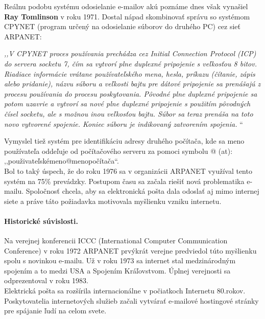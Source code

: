 \documentclass[10pt,twoside,slovak,a4paper]{article}
\begin{document}
Reálnu podobu systému odosielanie e-mailov akú poznáme dnes však vynašiel \textbf{Ray Tomlinson} v roku 1971. Dostal nápad skombinovať správu so systémom CPYNET (program určený na odosielanie súborov do druhého PC) cez sieť ARPANET:
\par
\vspace{.3cm}
\textit{,,V CPYNET proces používania prechádza cez Initial Connection Protocol (ICP) do servera socketu 7, čím sa vytvorí plne duplexné pripojenie s veľkosťou 8 bitov. Riadiace informácie vrátane používateľského mena, hesla, príkazu (čítanie, zápis alebo pridanie), názvu súboru a veľkosti bajtu pre dátové pripojenie sa prenášajú z procesu používania do procesu poskytovania. Pôvodné plne duplexné pripojenie sa potom uzavrie a vytvorí sa nové plne duplexné pripojenie s použitím pôvodných čísel socketu, ale s možnou inou veľkosťou bajtu. Súbor sa teraz prenáša na toto novo vytvorené spojenie. Koniec súboru je indikovaný zatvorením spojenia.} \cite{Bhushan}“
\par
\vspace{.3cm}
Vymyslel tiež systém pre identifikáciu adresy druhého počítača, kde sa meno používateľa oddeľuje od počítačového serveru za pomoci symbolu @ (at): ,,použivateľskémeno@menopočítača“.\\  
\hspace{0.5cm}
Bol to taký úspech, že do roku 1976 sa v organizácii ARPANET využíval tento systém na 75\% prevádzky. Postupom času sa začala riešiť nová problematika e-mailu. Spoločnosť chcela, aby sa elektronická pošta dala odoslať aj mimo internej siete a práve táto požiadavka motivovala myšlienku vzniku internetu. \\
\vspace{-0.3cm}
\paragraph{Historické súvislosti.}Na verejnej konferencii ICCC (International Computer Communication Conference) v roku 1972 ARPANET prvýkrát verejne predviedol túto myšlienku spolu s novinkou e-mailu. Už v roku 1973 sa internet stal medzinárodným spojením a to medzi USA a Spojením Kráľovstvom. Úplnej verejnosti sa odprezentoval v roku 1983.\\ 
\hspace{0.5cm}
Elektrická pošta sa rozšírila internacionálne v počiatkoch Internetu 80.rokov. Poskytovatelia internetových služieb začali vytvárať e-mailové hostingové stránky pre spájanie ľudí na celom svete. 
 
\end{document}
